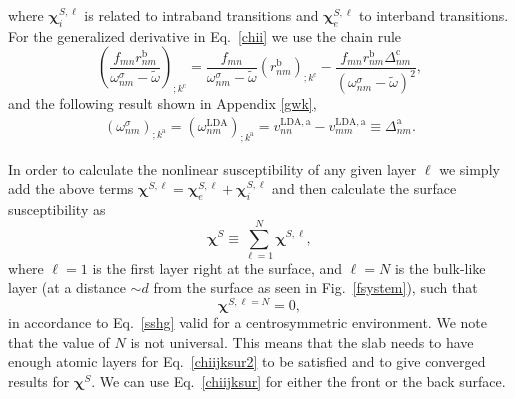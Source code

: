 where $\boldsymbol{\chi}^{S,\ell}_i$
 is related to intraband transitions and
$\boldsymbol{\chi}^{S,\ell}_e$
to interband transitions.
For the generalized derivative in Eq.~\eqref{chii} we use the chain rule 
\begin{equation}\label{gene2}
\left(\frac{f_{mn}r_{nm}^{\mathrm{b}}}{\omega^\sigma_{nm}-\tilde{\omega}}\right)_{;k^{\mathrm{c}}}=
\frac{f_{mn}}{\omega^\sigma_{nm}-\tilde{\omega}}\left(r_{nm}^{\mathrm{b}}\right)_{;k^{\mathrm{c}}}
-\frac{f_{mn}r_{nm}^{\mathrm{b}}\Delta_{nm}^\mathrm{c}}{(\omega^\sigma_{nm}-\tilde{\omega})^2}
,
\end{equation}
and the following result
shown in Appendix \ref{gwk},
\begin{align}\label{eli.13}
\left(\omega^\sigma_{nm}\right)_{;k^{\mathrm{a}}}
=
\left(\omega^{\mathrm{LDA}}_{nm}\right)_{;k^{\mathrm{a}}}
= 
v_{nn}^{\mathrm{LDA},\mathrm{a}}-v_{mm}^{\mathrm{LDA},\mathrm{a}}\equiv\Delta_{nm}^{\mathrm{a}}
.
\end{align} 

In order to calculate the nonlinear susceptibility of any given layer 
$\ell$ we simply add the above terms $\boldsymbol{\chi}^{S,\ell}=
\boldsymbol{\chi}_e^{S,\ell}+\boldsymbol{\chi}_i^{S,\ell}$ and 
then calculate the surface susceptibility as 
\begin{equation}\label{chiijksur}
\boldsymbol{\chi}^S\equiv \sum_{\ell=1}^{N}\boldsymbol{\chi}^{S,\ell},
\end{equation} 
where $\ell=1$ is the first layer right at the surface, 
and $\ell=N$ is the bulk-like layer (at a distance $\sim d$ from the
surface  as seen in
Fig.~\ref{fsystem}), such that 
\begin{equation}\label{chiijksur2}
\boldsymbol{\chi}^{S,\ell=N}=0,
\end{equation}
in accordance to Eq.~\eqref{sshg} valid for a centrosymmetric environment. 
We note that the value of
$N$ is not universal.
This means that the slab needs to have enough atomic layers for 
Eq.~\eqref{chiijksur2} 
to be satisfied and to give converged results for $\boldsymbol{\chi}^S$. 
We can use Eq.~\eqref{chiijksur} for
either the front or the back surface.

